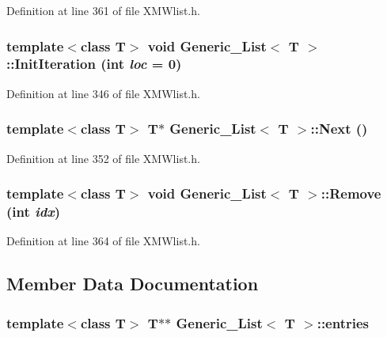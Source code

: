 Definition at line 361 of file XMWlist.h.
\subsubsection{\setlength{\rightskip}{0pt plus 5cm}template$<$class T$>$ void Generic\_\-List$<$ T $>$::Init\-Iteration (int {\em loc} = 0)\hspace{0.3cm}{\tt  [inline]}}\label{classGeneric__List_a3}




Definition at line 346 of file XMWlist.h.
\subsubsection{\setlength{\rightskip}{0pt plus 5cm}template$<$class T$>$ T$\ast$ Generic\_\-List$<$ T $>$::Next ()\hspace{0.3cm}{\tt  [inline]}}\label{classGeneric__List_a5}




Definition at line 352 of file XMWlist.h.
\subsubsection{\setlength{\rightskip}{0pt plus 5cm}template$<$class T$>$ void Generic\_\-List$<$ T $>$::Remove (int {\em idx})\hspace{0.3cm}{\tt  [inline]}}\label{classGeneric__List_a7}




Definition at line 364 of file XMWlist.h.

\subsection{Member Data Documentation}
\subsubsection{\setlength{\rightskip}{0pt plus 5cm}template$<$class T$>$ T$\ast$$\ast$ Generic\_\-List$<$ T $>$::entries\hspace{0.3cm}{\tt  [protected]}}\label{classGeneric__List_n3}




